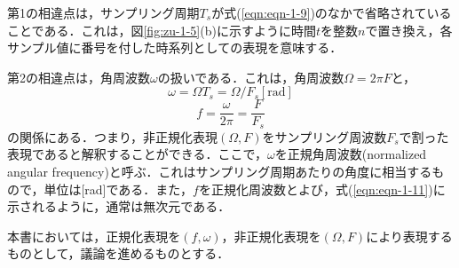 第1の相違点は，サンプリング周期$T_s$が式(\ref{eqn:eqn-1-9})のなかで省略されていることである．これは，図\ref{fig:zu-1-5}(b)に示すように時間$t$を整数$n$で置き換え，各サンプル値に番号を付した時系列としての表現を意味する．

第2の相違点は，角周波数$\omega$の扱いである．これは，角周波数$\Omega=2\pi F$と，
\begin{equation}
\omega=\Omega T_s=\Omega / F_s \mathrm{[rad]}
\label{eqn:eqn-1-10}
\end{equation}
\begin{equation}
f=\frac{\omega}{2\pi}=\frac{F}{F_s}
\label{eqn:eqn-1-11}
\end{equation}
の関係にある．つまり，非正規化表現$(\Omega,F)$をサンプリング周波数$F_s$で割った表現であると解釈することができる．ここで，$\omega$を正規角周波数(normalized angular frequency)と呼ぶ．これはサンプリング周期あたりの角度に相当するもので，単位は[rad]である．また，$f$を正規化周波数とよび，式(\ref{eqn:eqn-1-11})に示されるように，通常は無次元である．

本書においては，正規化表現を$(f,\omega)$，非正規化表現を$(\Omega, F)$により表現するものとして，議論を進めるものとする．

